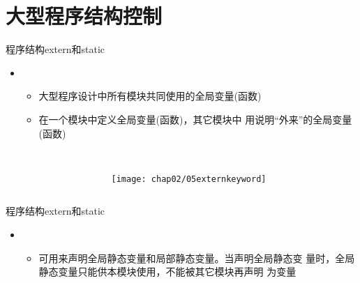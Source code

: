 \section[程序结构]{大型程序结构控制}\label{sec:chap02-sec07}
\begin{frame}[fragile]{程序结构}{extern和static}
  \begin{itemize}  
  \item {}    
    \begin{itemize}
      \tiny
    \item 大型程序设计中所有模块共同使用的全局变量(函数)
    \item 在一个模块中定义全局变量(函数)，其它模块中
      用说明``外来''的全局变量(函数)
    \end{itemize}
  \end{itemize}
  \vspace{-4.5ex}
  \begin{columns}
    \centering
    \begin{column}{0.42\textwidth}
      \centering
      \vspace{-6ex}
    \end{column}
    \begin{column}{0.42\textwidth}
      \centering
      \\[-0.5ex]%
      \texttt{[image: chap02/05externkeyword]}
    \end{column}
  \end{columns}
\end{frame}

\begin{frame}[fragile]{程序结构}{extern和static}
  \begin{itemize}  
  \item {}    
    \begin{itemize}
      \tiny
    \item {}可用来声明全局静态变量和局部静态变量。当声明全局静态变
      量时，全局静态变量只能供本模块使用，不能被其它模块再声明
      为变量
    \end{itemize}
  \end{itemize}
  \begin{center}
    \begin{minipage}{0.4\linewidth}
    \end{minipage}\qquad
    \begin{minipage}{0.4\linewidth}
    \end{minipage}
  \end{center}
\end{frame}

